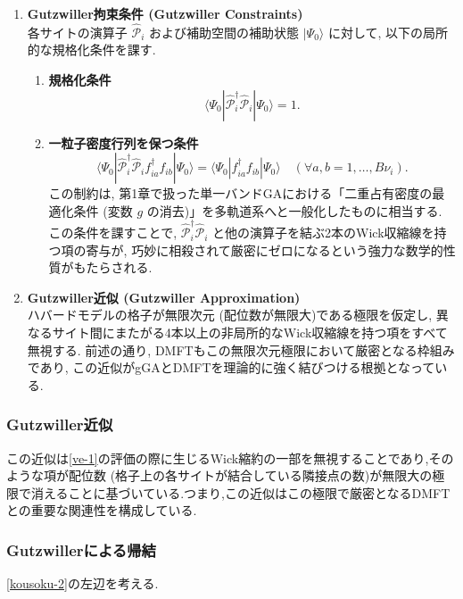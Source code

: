 \begin{enumerate}
    \item \textbf{Gutzwiller拘束条件 (Gutzwiller Constraints)} \\
    各サイトの演算子 $\hat{\mathcal{P}}_i$ および補助空間の補助状態 $|\Psi_0\rangle$ に対して, 以下の局所的な規格化条件を課す.
    \begin{enumerate}
    \item \textbf{規格化条件} 
    \begin{equation}
        \langle \Psi_0 | \hat{\mathcal{P}}_i^\dagger \hat{\mathcal{P}}_i | \Psi_0 \rangle = 1.
        \label{eq:gutz_constraint_1}
    \end{equation}
    \item \textbf{一粒子密度行列を保つ条件} 
    \begin{equation}
        \langle \Psi_0 | \hat{\mathcal{P}}_i^\dagger \hat{\mathcal{P}}_i f_{ia}^\dagger f_{ib} | \Psi_0 \rangle = \langle \Psi_0 | f_{ia}^\dagger f_{ib} | \Psi_0 \rangle \quad (\forall a,b = 1, \dots, B\nu_i).
        \label{eq:gutz_constraint_2}
    \end{equation}
    この制約は, 第1章で扱った単一バンドGAにおける「二重占有密度の最適化条件 (変数 $g$ の消去)」を多軌道系へと一般化したものに相当する. この条件を課すことで, $\hat{\mathcal{P}}_i^\dagger \hat{\mathcal{P}}_i$ と他の演算子を結ぶ2本のWick収縮線を持つ項の寄与が, 巧妙に相殺されて厳密にゼロになるという強力な数学的性質がもたらされる. 
    \end{enumerate}
    \item \textbf{Gutzwiller近似 (Gutzwiller Approximation)} \\
    ハバードモデルの格子が無限次元 (配位数が無限大)である極限を仮定し, 異なるサイト間にまたがる4本以上の非局所的なWick収縮線を持つ項をすべて無視する. 前述の通り, DMFTもこの無限次元極限において厳密となる枠組みであり, この近似がgGAとDMFTを理論的に強く結びつける根拠となっている. 
\end{enumerate}

\subsubsection{Gutzwiller近似}
この近似は\eqref{ve-1}の評価の際に生じるWick縮約の一部を無視することであり,そのような項が配位数 (格子上の各サイトが結合している隣接点の数)が無限大の極限で消えることに基づいている.つまり,この近似はこの極限で厳密となるDMFTとの重要な関連性を構成している.

\subsubsection{Gutzwillerによる帰結}
\eqref{kousoku-2}の左辺を考える.

